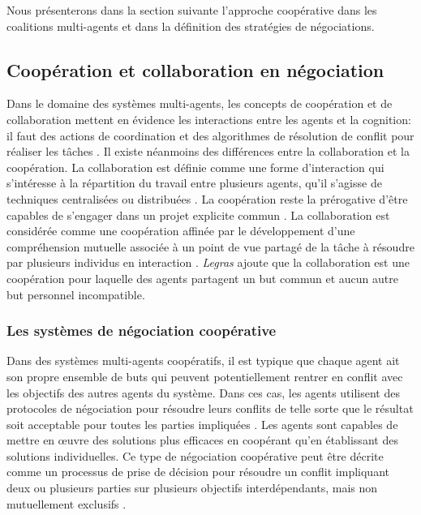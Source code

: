 	Nous présenterons dans la section suivante l'approche coopérative dans les coalitions multi-agents et dans la définition des stratégies de négociations. 
	
		\subsection{Coopération et collaboration en négociation}
		
		Dans le domaine des systèmes multi-agents, les concepts de coopération et de collaboration mettent en évidence les interactions entre les agents et la cognition: il faut des actions de coordination et des algorithmes de résolution de conflit pour réaliser les tâches \cite{jennings1995controlling}. Il existe néanmoins des différences entre la collaboration et la coopération.
		La collaboration est définie comme une forme d'interaction qui s'intéresse à la répartition du travail entre plusieurs agents, qu'il s'agisse de techniques centralisées ou distribuées \cite{ferber1997systemes}. La coopération reste la prérogative d'être capables de s'engager dans un projet explicite commun \cite{lucien2016multiagent}.
		La collaboration est considérée comme une coopération affinée par le développement d'une compréhension mutuelle associée à un point de vue partagé de la tâche à résoudre par plusieurs individus en interaction \cite{weiss1999multiagent,blanquet2007web}. \emph{Legras} \cite{legrascooperation} ajoute que la collaboration est une coopération pour laquelle des agents partagent un but commun et aucun autre but personnel incompatible. 
		
		\subsubsection{Les systèmes de négociation coopérative}
		
		Dans des systèmes multi-agents coopératifs, il est typique que chaque agent ait son propre ensemble de buts qui peuvent potentiellement rentrer en conflit avec les objectifs des autres agents du système.
		 Dans ces cas, les agents utilisent des protocoles de négociation pour résoudre leurs conflits de telle sorte que le résultat soit acceptable pour toutes les parties impliquées \cite{wollkind2004automated}. Les agents sont capables de mettre en œuvre des solutions plus efficaces en coopérant qu'en établissant des solutions individuelles. Ce type de négociation coopérative peut être décrite comme un processus de prise de décision pour résoudre un conflit impliquant deux ou plusieurs parties sur plusieurs objectifs interdépendants, mais non mutuellement exclusifs \cite{lewicki2011essentials}. 
	
